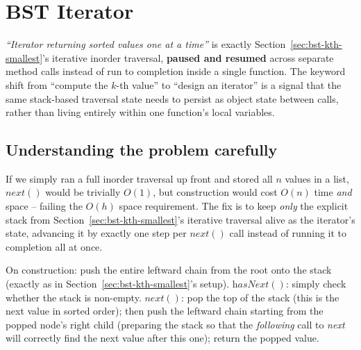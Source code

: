 \section{BST Iterator}
\label{sec:bst-iterator}


\begin{patternbox}
\emph{``Iterator returning sorted values one at a time''} is exactly
Section~\ref{sec:bst-kth-smallest}'s iterative inorder traversal,
\textbf{paused and resumed} across separate method calls instead of run
to completion inside a single function. The keyword shift from
``compute the $k$-th value'' to ``design an iterator'' is a signal that
the same stack-based traversal state needs to persist as object state
between calls, rather than living entirely within one function's local
variables.
\end{patternbox}

\subsection*{Understanding the problem carefully}

If we simply ran a full inorder traversal up front and stored all $n$
values in a list, $\textit{next}()$ would be trivially $O(1)$, but
construction would cost $O(n)$ time \emph{and} space -- failing the
$O(h)$ space requirement. The fix is to keep \emph{only} the explicit
stack from Section~\ref{sec:bst-kth-smallest}'s iterative traversal alive
as the iterator's state, advancing it by exactly one step per
$\textit{next}()$ call instead of running it to completion all at once.

\begin{ideabox}
On construction: push the entire leftward chain from the root onto the
stack (exactly as in Section~\ref{sec:bst-kth-smallest}'s setup).
$\textit{hasNext}()$: simply check whether the stack is non-empty.
$\textit{next}()$: pop the top of the stack (this is the next value in
sorted order); then push the leftward chain starting from the popped
node's right child (preparing the stack so that the \emph{following}
call to \textit{next} will correctly find the next value after this
one); return the popped value.
\end{ideabox}

